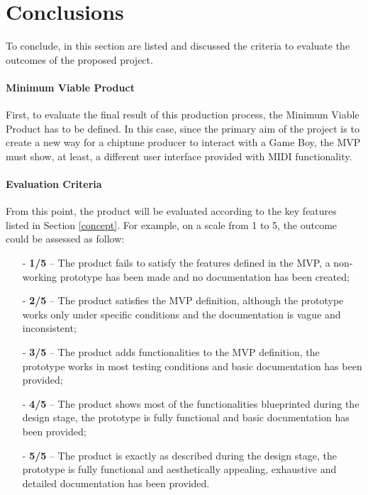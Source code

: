 \documentclass[]{article}
\begin{document}
    
        \section{Conclusions}
            To conclude, in this section are listed and discussed the criteria to evaluate the outcomes of the proposed project.

            \paragraph{Minimum Viable Product}
            First, to evaluate the final result of this production process, the Minimum Viable Product has to be defined. In this case, since the primary aim
            of the project is to create a new way for a chiptune producer to interact with a Game Boy, the MVP must show, at least, a different user interface 
            provided with MIDI functionality.

            \paragraph{Evaluation Criteria}
            From this point, the product will be evaluated according to the key features listed in Section \ref{concept}. For example, on a scale from
            1 to 5, the outcome could be assessed as follow:

            \begin{itemize}
                \item[-] \textbf{1/5} -- The product fails to satisfy the features defined in the MVP, a non-working prototype has been made and no documentation
                            has been created;
                \item[-] \textbf{2/5} -- The product satisfies the MVP definition, although the prototype works only under specific conditions and the documentation is 
                            vague and inconsistent;
                \item[-] \textbf{3/5} -- The product adds functionalities to the MVP definition, the prototype works in most testing conditions and basic documentation has been 
                            provided; 
                \item[-] \textbf{4/5} -- The product shows most of the functionalities blueprinted during the design stage, the prototype is fully functional and basic documentation
                            has been provided; 
                \item[-] \textbf{5/5} -- The product is exactly as described during the design stage, the prototype is fully functional and aesthetically appealing, 
                            exhaustive and detailed documentation has been provided. 
                      
            \end{itemize}
        
\end{document}
